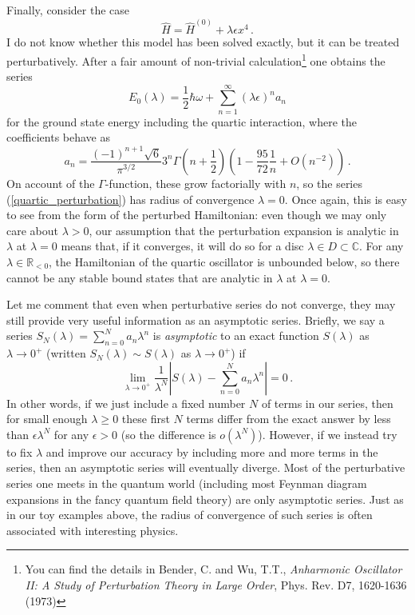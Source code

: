 \documentclass{article}
\theoremstyle{plain}\theoremheaderfont{\normalfont\itshape}\theorembodyfont{\rmfamily}\theoremseparator{.}\newtheorem*{rem}{Remark}\newtheorem*{ex}{Example}\newtheorem*{proof}{Proof}\newtheorem*{altp}{Alternative proof}
\theoremstyle{plain}\theoremheaderfont{\normalfont\bfseries}\theorembodyfont{\rmfamily}\theoremseparator{.}\newtheorem{thm}{Theorem}[section]\newtheorem{lem}[thm]{Lemma}\newtheorem{prop}[thm]{Proposition}\newtheorem*{cor}{Corollary}\newtheorem{defn}[thm]{Definition}\newtheorem{clm}[thm]{Claim}\newtheorem{clminproof}{Claim}
\theoremstyle{break}\theoremheaderfont{\normalfont\itshape}\theorembodyfont{\rmfamily}\theoremseparator{.\medskip}\newtheorem*{proofskip}{Proof}\newtheorem*{exs}{Examples}\newtheorem*{rems}{Remarks}
\theoremstyle{break}\theoremheaderfont{\normalfont\bfseries}\theorembodyfont{\rmfamily}\theoremseparator{.\medskip}\newtheorem{lemskip}[thm]{Lemma}\newtheorem{defnskip}[thm]{Definition}\newtheorem{propskip}[thm]{Proposition}\newtheorem{thmskip}[thm]{Theorem}
\numberwithin{equation}{section}
\newcommand{\abs}[1]{\left| #1 \right|}
\newcommand{\RR}{\mathbb{R}}
\newcommand{\CC}{\mathbb{C}}
\begin{document}
    Finally, consider the case
    \begin{equation}
        \hat{H}=\hat{H}^{(0)}+\lambda\epsilon x^4\,.
    \end{equation}
    I do not know whether this model has been solved exactly, but it can be treated perturbatively. After a fair amount of non-trivial calculation\footnote{You can find the details in Bender, C. and Wu, T.T., \textit{Anharmonic Oscillator II: A Study of Perturbation Theory in Large Order}, Phys. Rev. D7, 1620-1636 (1973)} one obtains the series
    \begin{equation}\label{quartic_perturbation}
        E_0(\lambda)=\frac{1}{2}\hbar\omega+\sum_{n=1}^{\infty}(\lambda\epsilon)^n a_n
    \end{equation}
    for the ground state energy including the quartic interaction, where the coefficients behave as
    \begin{equation}
        a_n=\frac{(-1)^{n+1}\sqrt{6}}{\pi^{3/2}}3^n\Gamma\left(n+\frac{1}{2}\right)\left(1-\frac{95}{72}\frac{1}{n}+O(n^{-2})\right)\,.
    \end{equation}
    On account of the \(\Gamma\)-function, these grow factorially with \(n\), so the series (\ref{quartic_perturbation}) has radius of convergence \(\lambda=0\). Once again, this is easy to see from the form of the perturbed Hamiltonian: even though we may only care about \(\lambda>0\), our assumption that the perturbation expansion is analytic in \(\lambda\) at \(\lambda=0\) means that, if it converges, it will do so for a disc \(\lambda\in D\subset\CC\). For any \(\lambda\in\RR_{<0}\), the Hamiltonian of the quartic oscillator is unbounded below, so there cannot be any stable bound states that are analytic in \(\lambda\) at \(\lambda=0\).

    Let me comment that even when perturbative series do not converge, they may still provide very useful information as an asymptotic series. Briefly, we say a series \(S_N(\lambda)=\sum_{n=0}^{N}a_n\lambda^n\) is \textit{asymptotic} to an exact function \(S(\lambda)\) as \(\lambda\to 0^+\) (written \(S_N(\lambda)\sim S(\lambda)\) as \(\lambda\to 0^+\)) if
    \begin{equation}
        \lim_{\lambda\to 0^+}\frac{1}{\lambda^N}\abs{S(\lambda)-\sum_{n=0}^{N}a_n\lambda^n}=0\,.
    \end{equation}
    In other words, if we just include a fixed number \(N\) of terms in our series, then for small enough \(\lambda\ge 0\) these first \(N\) terms differ from the exact answer by less than \(\epsilon\lambda^N\) for any \(\epsilon>0\) (so the difference is \(o(\lambda^N)\)). However, if we instead try to fix \(\lambda\) and improve our accuracy by including more and more terms in the series, then an asymptotic series will eventually diverge. Most of the perturbative series one meets in the quantum world (including most Feynman diagram expansions in the fancy quantum field theory) are only asymptotic series. Just as in our toy examples above, the radius of convergence of such series is often associated with interesting physics.
\end{document}
